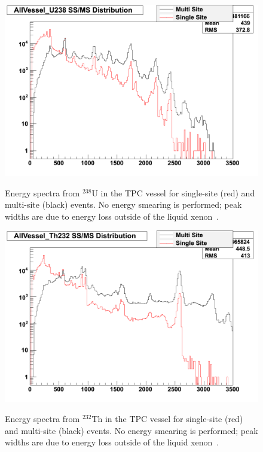 \begin{figure}
\begin{center}
\includegraphics[keepaspectratio=true,width=\textwidth]{AllVessel_U238_single_multi_site_spec.png}
\end{center}
\renewcommand{\baselinestretch}{1}
\small\normalsize
\begin{quote}
\caption{Energy spectra from $^{238}$U in the TPC vessel for single-site (red) and multi-site (black) events.  No energy smearing is performed; peak widths are due to energy loss outside of the liquid xenon~\cite{MCDocumentRun2a}.}
\label{fig:UGeantSpectra}
\end{quote}
\end{figure}
\renewcommand{\baselinestretch}{2}
\small\normalsize

\begin{figure}
\begin{center}
\includegraphics[keepaspectratio=true,width=\textwidth]{AllVessel_Th232_single_multi_site_spec.png}
\end{center}
\renewcommand{\baselinestretch}{1}
\small\normalsize
\begin{quote}
\caption{Energy spectra from $^{232}$Th in the TPC vessel for single-site (red) and multi-site (black) events.  No energy smearing is performed; peak widths are due to energy loss outside of the liquid xenon~\cite{MCDocumentRun2a}.}
\label{fig:ThGeantSpectra}
\end{quote}
\end{figure}
\renewcommand{\baselinestretch}{2}
\small\normalsize

